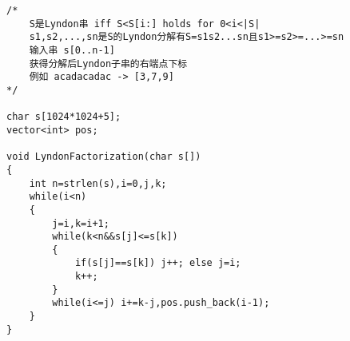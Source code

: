 \begin{lstlisting}
/*
    S是Lyndon串 iff S<S[i:] holds for 0<i<|S|
    s1,s2,...,sn是S的Lyndon分解有S=s1s2...sn且s1>=s2>=...>=sn
    输入串 s[0..n-1]
    获得分解后Lyndon子串的右端点下标
    例如 acadacadac -> [3,7,9]
*/

char s[1024*1024+5];
vector<int> pos;

void LyndonFactorization(char s[])
{
    int n=strlen(s),i=0,j,k;
    while(i<n)
    {
        j=i,k=i+1;
        while(k<n&&s[j]<=s[k])
        {
            if(s[j]==s[k]) j++; else j=i;
            k++;
        }
        while(i<=j) i+=k-j,pos.push_back(i-1);
    }
}
\end{lstlisting}